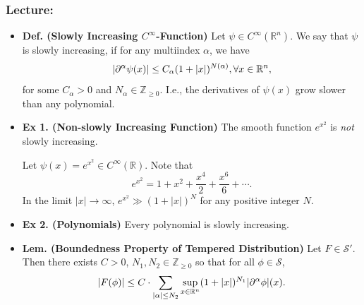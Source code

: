 \documentclass{article}
\begin{document}
\subsubsection{Lecture:} 
\begin{itemize}
	\item \textbf{Def. (Slowly Increasing $C^{\infty}$-Function)} Let $\psi \in C^{\infty}(\mathbb{R}^{n})$. We say that $\psi$ is slowly increasing, if for any multiindex $\alpha$, we have 
		\begin{equation}
			\left| \partial^{\alpha}\psi(x) \right| \leq C_{\alpha}(1 + |x|)^{N(\alpha)}, \forall x \in \mathbb{R}^{n}, 
		\end{equation}
	for some $C_{\alpha} > 0$ and $N_{\alpha} \in \mathbb{Z}_{\geq 0}$. I.e., the derivatives of $\psi(x)$ grow slower than any polynomial. 
	
	\item \textbf{Ex 1. (Non-slowly Increasing Function)} The smooth function $e^{x^{2}}$ is \textit{not} slowly increasing. 
		
		{\color{orange}
			Let $\psi(x) = e^{x^{2}} \in C^{\infty}(\mathbb{R})$. Note that 	
				\begin{equation}
					e^{x^{2}} = 1 + x^{2} + \frac{x^{4}}{2} + \frac{x^{6}}{6} + \dotsm. 
				\end{equation}
			In the limit $|x| \to \infty$, $e^{x^{2}} \gg (1 + |x|)^{N}$ for any positive integer $N$. 
		}
	\item \textbf{Ex 2. (Polynomials)} Every polynomial is slowly increasing. 
	
	\item \textbf{Lem. (Boundedness Property of Tempered Distribution)} Let $F \in \mathcal{S}'$. Then there exists $C > 0$, $N_{1}, N_{2} \in \mathbb{Z}_{\geq 0}$ so that for all $\phi \in \mathcal{S}$, 
		\begin{equation}
			\left| F(\phi) \right| \leq C \cdot \sum_{|\alpha| \leq N_{2}}\sup_{x \in \mathbb{R}^{n}}(1 + |x|)^{N_{1}}|\partial^{\alpha}\phi|(x). 
		\end{equation}
		

\end{itemize}
\end{document}
